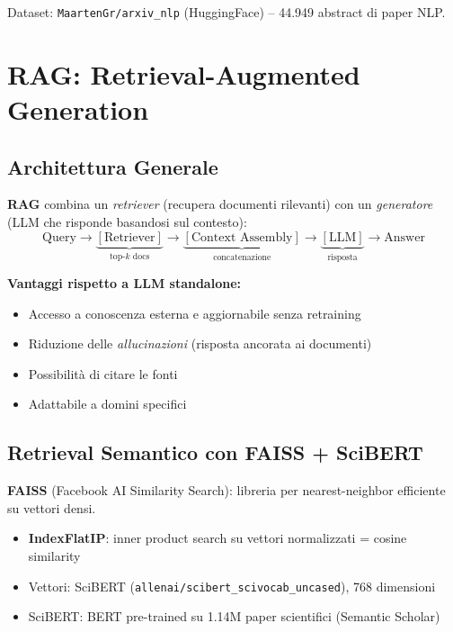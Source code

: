 \documentclass[12pt,a4paper]{article}
\begin{document}
Dataset: \texttt{MaartenGr/arxiv\_nlp} (HuggingFace) -- 44.949 abstract di paper NLP.

\section{RAG: Retrieval-Augmented Generation}

\subsection{Architettura Generale}

\begin{defbox}
\textbf{RAG} combina un \emph{retriever} (recupera documenti rilevanti) con un \emph{generatore} (LLM che risponde basandosi sul contesto):
\[
\text{Query} \to \underbrace{[\text{Retriever}]}_{\text{top-}k\text{ docs}} \to \underbrace{[\text{Context Assembly}]}_{\text{concatenazione}} \to \underbrace{[\text{LLM}]}_{\text{risposta}} \to \text{Answer}
\]

\textbf{Vantaggi rispetto a LLM standalone:}
\begin{itemize}
  \item Accesso a conoscenza esterna e aggiornabile senza retraining
  \item Riduzione delle \emph{allucinazioni} (risposta ancorata ai documenti)
  \item Possibilit\`a di citare le fonti
  \item Adattabile a domini specifici
\end{itemize}
\end{defbox}

\subsection{Retrieval Semantico con FAISS + SciBERT}

\begin{defbox}
\textbf{FAISS} (Facebook AI Similarity Search): libreria per nearest-neighbor efficiente su vettori densi.
\begin{itemize}
  \item \textbf{IndexFlatIP}: inner product search su vettori normalizzati = cosine similarity
  \item Vettori: SciBERT (\texttt{allenai/scibert\_scivocab\_uncased}), 768 dimensioni
  \item SciBERT: BERT pre-trained su 1.14M paper scientifici (Semantic Scholar)
\end{itemize}
\end{defbox}
\end{document}
